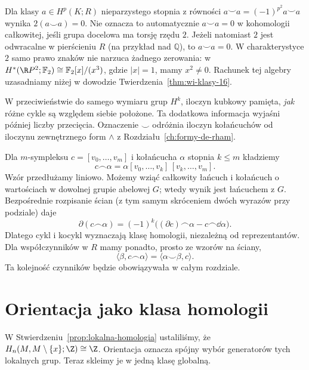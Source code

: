 \begin{uwaga}
Dla klasy $a\in H^p(K;R)$ nieparzystego stopnia
z równości $a\smile a=(-1)^{p^2}a\smile a$
wynika $2(a\smile a)=0$. Nie oznacza to automatycznie
$a\smile a=0$ w kohomologii całkowitej, jeśli grupa
docelowa ma torsję rzędu $2$. Jeżeli natomiast $2$
jest odwracalne w pierścieniu $R$ (na przykład nad
$\mathbb Q$), to $a\smile a=0$.
W charakterystyce $2$ samo prawo znaków nie narzuca
żadnego zerowania: w
$H^*(\R P^2;\mathbb F_2)
\cong\mathbb F_2[x]/(x^3)$, gdzie $|x|=1$,
mamy $x^2\ne0$. Rachunek tej algebry
uzasadniamy niżej w dowodzie
Twierdzenia~\ref{thm:wi-klasy-16}.
\end{uwaga}

W przeciwieństwie do samego wymiaru
grup $H^k$, iloczyn kubkowy pamięta,
\emph{jak} różne cykle są względem siebie
położone. Ta dodatkowa informacja
wyjaśni później liczby przecięcia.
Oznaczenie $\smile$ odróżnia
iloczyn kołańcuchów od iloczynu
zewnętrznego form $\wedge$ z
Rozdziału~\ref{ch:formy-de-rham}.

\begin{definicja}
\label{def:kapowy-16}
Dla $m$-sympleksu $c=[v_0,\ldots,v_m]$ i kołańcucha
$\alpha$ stopnia $k\leq m$ kładziemy
\[
 c\frown\alpha=\alpha[v_0,\ldots,v_k]\,[v_k,\ldots,v_m].
\]
Wzór przedłużamy liniowo. Możemy wziąć całkowity łańcuch
i kołańcuch o wartościach w dowolnej grupie abelowej $G$;
wtedy wynik jest łańcuchem z $G$. Bezpośrednie rozpisanie
ścian (z tym samym skróceniem dwóch wyrazów przy podziale)
daje
\begin{equation}\label{eq:kapowy-brzeg-16}
 \partial(c\frown\alpha)=(-1)^k
  \bigl((\partial c)\frown\alpha-c\frown\dd\alpha\bigr).
\end{equation}
Dlatego cykl i kocykl wyznaczają klasę homologii,
niezależną od reprezentantów. Dla współczynników w $R$
mamy ponadto, prosto ze wzorów na ściany,
\[
 \langle\beta,c\frown\alpha\rangle
 =\langle\alpha\smile\beta,c\rangle.
\]
Ta kolejność czynników będzie obowiązywała w całym rozdziale.
\end{definicja}

\section{Orientacja jako klasa homologii}
\label{sec:klasa-fundamentalna-16}

W Stwierdzeniu~\ref{prop:lokalna-homologia}
ustaliliśmy, że
$H_n(M,M\setminus\{x\};\Z)\cong\Z$.
Orientacja oznacza spójny wybór
generatorów tych lokalnych grup.
Teraz skleimy je w jedną klasę
globalną.

